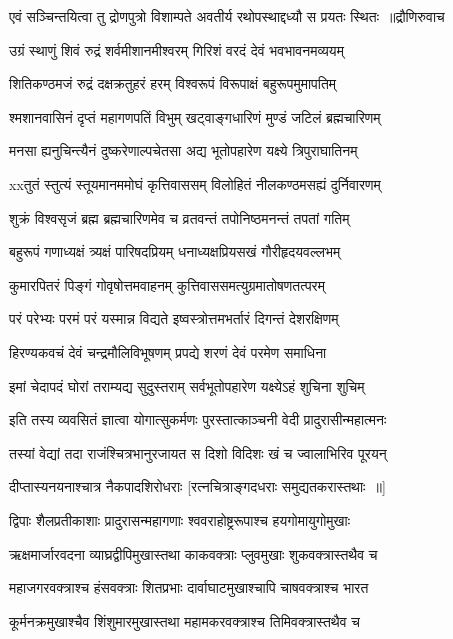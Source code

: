 \threelineshloka
{एवं सञ्चिन्तयित्वा तु द्रोणपुत्रो विशाम्पते}
{अवतीर्य रथोपस्थाद्दध्यौ स प्रयतः स्थितः ॥द्रौणिरुवाच}
{}


\twolineshloka
{उग्रं स्थाणुं शिवं रुद्रं शर्वमीशानमीश्वरम्}
{गिरिशं वरदं देवं भवभावनमव्ययम्}


\twolineshloka
{शितिकण्ठमजं रुद्रं दक्षक्रतुहरं हरम्}
{विश्वरूपं विरूपाक्षं बहुरूपमुमापतिम्}


\twolineshloka
{श्मशानवासिनं दृप्तं महागणपतिं विभुम्}
{खट्वाङ्गधारिणं मुण्डं जटिलं ब्रह्मचारिणम्}


\twolineshloka
{मनसा ह्यनुचिन्त्यैनं दुष्करेणाल्पचेतसा}
{अद्य भूतोपहारेण यक्ष्ये त्रिपुराघातिनम्}


\twolineshloka
{xxतुतं स्तुत्यं स्तूयमानममोघं कृत्तिवाससम्}
{विलोहितं नीलकण्ठमसह्यं दुर्निवारणम्}


\twolineshloka
{शुक्रं विश्वसृजं ब्रह्म ब्रह्मचारिणमेव च}
{व्रतवन्तं तपोनिष्ठमनन्तं तपतां गतिम्}


\twolineshloka
{बहुरूपं गणाध्यक्षं त्र्यक्षं पारिषदप्रियम्}
{धनाध्यक्षप्रियसखं गौरीहृदयवल्लभम्}


\twolineshloka
{कुमारपितरं पिङ्गं गोवृषोत्तमवाहनम्}
{कुत्तिवाससमत्युग्रमातोषणतत्परम्}


\twolineshloka
{परं परेभ्यः परमं परं यस्मान्न विद्यते}
{इष्वस्त्रोत्तमभर्तारं दिगन्तं देशरक्षिणम्}


\twolineshloka
{हिरण्यकवचं देवं चन्द्रमौलिविभूषणम्}
{प्रपद्ये शरणं देवं परमेण समाधिना}


\twolineshloka
{इमां चेदापदं घोरां तराम्यद्य सुदुस्तराम्}
{सर्वभूतोपहारेण यक्ष्येऽहं शुचिना शुचिम्}


\twolineshloka
{इति तस्य व्यवसितं ज्ञात्वा योगात्सुकर्मणः}
{पुरस्तात्काञ्चनी वेदी प्रादुरासीन्महात्मनः}


\twolineshloka
{तस्यां वेद्यां तदा राजंश्चित्रभानुरजायत}
{स दिशो विदिशः खं च ज्वालाभिरिव पूरयन्}


\twolineshloka
{दीप्तास्यनयनाश्चात्र नैकपादशिरोधराः}
{[रत्नचित्राङ्गदधराः समुद्यतकरास्तथाः ॥]}


\twolineshloka
{द्विपाः शैलप्रतीकाशाः प्रादुरासन्महागणाः}
{श्ववराहोष्ट्ररूपाश्च हयगोमायुगोमुखाः}


\twolineshloka
{ऋक्षमार्जारवदना व्याघ्रद्वीपिमुखास्तथा}
{काकवक्त्राः प्लुवमुखाः शुकवक्त्रास्तथैव च}


\twolineshloka
{महाजगरवक्त्राश्च हंसवक्त्राः शितप्रभाः}
{दार्वाघाटमुखाश्चापि चाषवक्त्राश्च भारत}


\twolineshloka
{कूर्मनक्रमुखाश्चैव शिंशुमारमुखास्तथा}
{महामकरवक्त्राश्च तिमिवक्त्रास्तथैव च}


